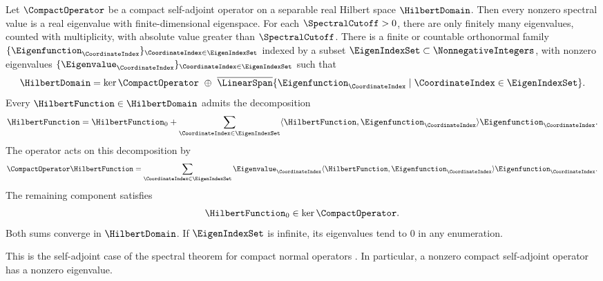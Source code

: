 \begin{theorem}\label{prop:spectral-basics}
Let
$\CompactOperator $
be a compact self-adjoint operator on a separable real Hilbert space
$\HilbertDomain $.
Then every nonzero spectral value is a real eigenvalue with finite-dimensional
eigenspace.
For each
$\SpectralCutoff >0$,
there are only finitely many eigenvalues,
counted with multiplicity,
with absolute value greater than
$\SpectralCutoff $.
There is a finite or countable orthonormal family
$\{\Eigenfunction _\CoordinateIndex \}_{\CoordinateIndex \in \EigenIndexSet }$
indexed by a subset
$\EigenIndexSet\subset\NonnegativeIntegers$,
with nonzero eigenvalues
$\{\Eigenvalue _\CoordinateIndex \}_{\CoordinateIndex \in \EigenIndexSet }$
such that
\[
 \HilbertDomain =\ker \CompactOperator \ \mathbin{\oplus}\
       \overline{\LinearSpan }\{\Eigenfunction _\CoordinateIndex \mid \CoordinateIndex \in \EigenIndexSet \}.
\]
Every
$\HilbertFunction \in \HilbertDomain $
admits the decomposition
\[
 \HilbertFunction =\HilbertFunction _0+\sum_{\CoordinateIndex \in \EigenIndexSet }\langle \HilbertFunction ,\Eigenfunction _\CoordinateIndex \rangle \Eigenfunction _\CoordinateIndex .
\]
The operator acts on this decomposition by
\[
 \CompactOperator \HilbertFunction =\sum_{\CoordinateIndex \in \EigenIndexSet }\Eigenvalue _\CoordinateIndex \langle \HilbertFunction ,\Eigenfunction _\CoordinateIndex \rangle \Eigenfunction _\CoordinateIndex .
\]
The remaining component satisfies
\[
 \HilbertFunction _0\in\ker \CompactOperator .
\]
Both sums converge in
$\HilbertDomain $.
If
$\EigenIndexSet $
is infinite,
its eigenvalues tend to
$0$
in any enumeration.
\end{theorem}

This is the self-adjoint case of the spectral theorem for compact normal
operators
\cite[Theorems~14.19 and~15.22]{Muscat2024}.
In particular,
a nonzero compact self-adjoint operator has a nonzero eigenvalue.
